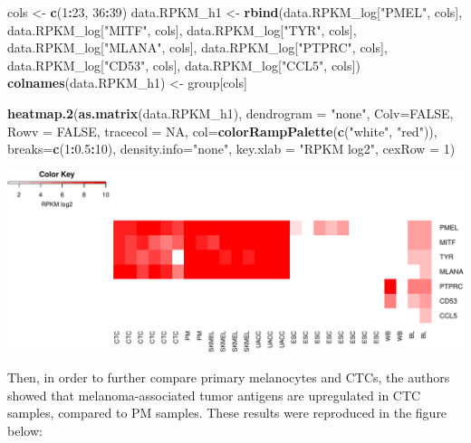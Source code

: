 \documentclass[]{article}
\newenvironment{Shaded}{\begin{snugshade}}{\end{snugshade}}
\newcommand{\KeywordTok}[1]{\textcolor[rgb]{0.13,0.29,0.53}{\textbf{#1}}}
\newcommand{\DataTypeTok}[1]{\textcolor[rgb]{0.13,0.29,0.53}{#1}}
\newcommand{\DecValTok}[1]{\textcolor[rgb]{0.00,0.00,0.81}{#1}}
\newcommand{\FloatTok}[1]{\textcolor[rgb]{0.00,0.00,0.81}{#1}}
\newcommand{\StringTok}[1]{\textcolor[rgb]{0.31,0.60,0.02}{#1}}
\newcommand{\OtherTok}[1]{\textcolor[rgb]{0.56,0.35,0.01}{#1}}
\newcommand{\OperatorTok}[1]{\textcolor[rgb]{0.81,0.36,0.00}{\textbf{#1}}}
\newcommand{\NormalTok}[1]{#1}
\begin{document}
\begin{Shaded}
\begin{Highlighting}[]
\NormalTok{cols <-}\StringTok{ }\KeywordTok{c}\NormalTok{(}\DecValTok{1}\OperatorTok{:}\DecValTok{23}\NormalTok{, }\DecValTok{36}\OperatorTok{:}\DecValTok{39}\NormalTok{)}
\NormalTok{data.RPKM_h1 <-}\StringTok{ }\KeywordTok{rbind}\NormalTok{(data.RPKM_log[}\StringTok{"PMEL"}\NormalTok{, cols], data.RPKM_log[}\StringTok{"MITF"}\NormalTok{, cols],}
\NormalTok{                      data.RPKM_log[}\StringTok{"TYR"}\NormalTok{, cols], data.RPKM_log[}\StringTok{"MLANA"}\NormalTok{, cols],}
\NormalTok{                      data.RPKM_log[}\StringTok{"PTPRC"}\NormalTok{, cols], data.RPKM_log[}\StringTok{"CD53"}\NormalTok{, cols],}
\NormalTok{                      data.RPKM_log[}\StringTok{"CCL5"}\NormalTok{, cols])}
\KeywordTok{colnames}\NormalTok{(data.RPKM_h1) <-}\StringTok{ }\NormalTok{group[cols]}

\KeywordTok{heatmap.2}\NormalTok{(}\KeywordTok{as.matrix}\NormalTok{(data.RPKM_h1), }\DataTypeTok{dendrogram =} \StringTok{"none"}\NormalTok{, }\DataTypeTok{Colv=}\OtherTok{FALSE}\NormalTok{, }\DataTypeTok{Rowv =} \OtherTok{FALSE}\NormalTok{,}
          \DataTypeTok{tracecol =} \OtherTok{NA}\NormalTok{, }\DataTypeTok{col=}\KeywordTok{colorRampPalette}\NormalTok{(}\KeywordTok{c}\NormalTok{(}\StringTok{"white"}\NormalTok{, }\StringTok{"red"}\NormalTok{)),}
          \DataTypeTok{breaks=}\KeywordTok{c}\NormalTok{(}\DecValTok{1}\OperatorTok{:}\FloatTok{0.5}\OperatorTok{:}\DecValTok{10}\NormalTok{), }\DataTypeTok{density.info=}\StringTok{"none"}\NormalTok{, }\DataTypeTok{key.xlab =} \StringTok{"RPKM log2"}\NormalTok{, }\DataTypeTok{cexRow =} \DecValTok{1}\NormalTok{)}
\end{Highlighting}
\end{Shaded}

\includegraphics{Project_jankauskaite_ugne_files/figure-latex/unnamed-chunk-36-1.pdf}

Then, in order to further compare primary melanocytes and CTCs, the
authors showed that melanoma-associated tumor antigens are upregulated
in CTC samples, compared to PM samples. These results were reproduced in
the figure below:
\end{document}

